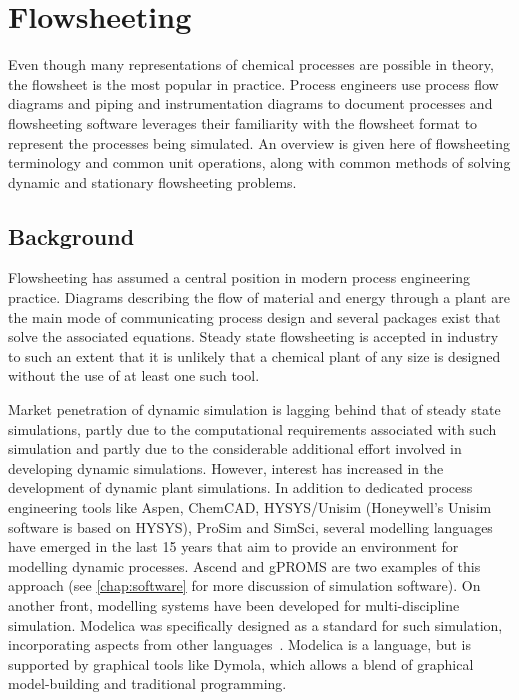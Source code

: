 \chapter{Flowsheeting}

\begin{overview}
  Even though many representations of chemical processes are possible
  in theory, the flowsheet is the most popular in practice.  Process
  engineers use process flow diagrams and piping and instrumentation
  diagrams to document processes and flowsheeting software leverages
  their familiarity with the flowsheet format to represent the
  processes being simulated.  An overview is given here of
  flowsheeting terminology and common unit operations, along with
  common methods of solving dynamic and stationary flowsheeting
  problems.
\end{overview}

\section{Background}
Flowsheeting has assumed a central position in modern process engineering
practice.  Diagrams describing the flow of material and energy through a plant are the main mode of communicating process
design and several packages exist that solve the associated equations.
Steady state flowsheeting is accepted in industry to such an extent
that it is unlikely that a chemical plant of any size is designed
without the use of at least one such tool.~\citep{glasscock.hale1994process}

Market penetration of dynamic simulation is lagging behind that of
steady state simulations, partly due to the computational requirements
associated with such simulation and partly due to the considerable
additional effort involved in developing dynamic simulations.
However, interest has increased in the development of dynamic plant
simulations.  In addition to dedicated process engineering tools like
Aspen, ChemCAD, HYSYS/Unisim (Honeywell's Unisim software is
  based on HYSYS), ProSim and SimSci, several modelling languages have
emerged in the last 15 years that aim to provide an environment for
modelling dynamic processes.  Ascend and gPROMS are two examples of
this approach (see \ref{chap:software} for more discussion of simulation
software). On another front, modelling systems have been developed for
multi-discipline simulation.  Modelica was specifically designed as a standard
for such simulation, incorporating aspects from other languages~\citep{elmqvist.ab1997modelica,tiller.ph-d-2001introduction}.  Modelica is a language,
but is supported by graphical tools like Dymola, which allows a blend
of graphical model-building and traditional programming.

